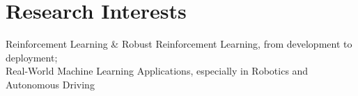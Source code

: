 \section{Research Interests}
    \quad Reinforcement Learning \& Robust Reinforcement Learning, from development to deployment;
    \\\quad Real-World Machine Learning Applications, especially in Robotics and Autonomous Driving
    
